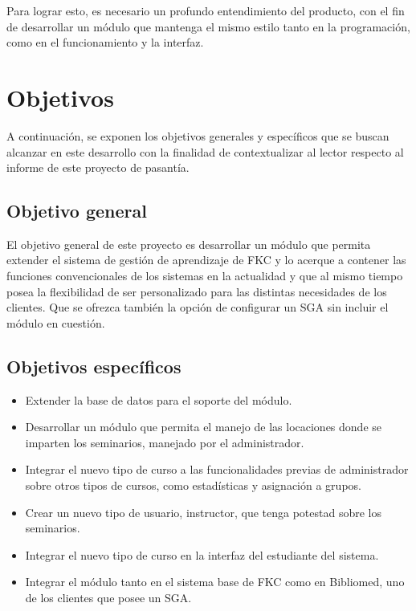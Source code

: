 Para lograr esto, es necesario un profundo entendimiento del producto, con el fin de desarrollar un módulo que mantenga el mismo estilo tanto en la programación, como en el funcionamiento y la interfaz. 


\section*{Objetivos}
A continuación, se exponen los objetivos generales y específicos que se buscan alcanzar en este desarrollo con la finalidad de contextualizar al lector respecto al informe de este proyecto de pasantía.

\subsection*{Objetivo general}
El objetivo general de este proyecto es desarrollar un módulo que permita extender el sistema de gestión de aprendizaje de \gls{FKC} y lo acerque a contener las funciones convencionales de los sistemas en la actualidad y que al mismo tiempo posea la flexibilidad de ser personalizado para las distintas necesidades de los clientes. Que se ofrezca también la opción de configurar un \gls{SGA} sin incluir el módulo en cuestión.

\subsection*{Objetivos específicos}

\begin{itemize}
	\item Extender la base de datos para el soporte del módulo.
	\item Desarrollar un módulo que permita el manejo de las locaciones donde se imparten los seminarios, manejado por el administrador.
	\item Integrar el nuevo tipo de curso a las funcionalidades previas de administrador sobre otros tipos de cursos, como estadísticas y asignación a grupos.
	\item Crear un nuevo tipo de usuario, instructor, que tenga potestad sobre los seminarios.
	\item Integrar el nuevo tipo de curso en la interfaz del estudiante del sistema.
	\item Integrar el módulo tanto en el sistema base de \gls{FKC} como en Bibliomed, uno de los clientes que posee un \gls{SGA}.
\end{itemize}








